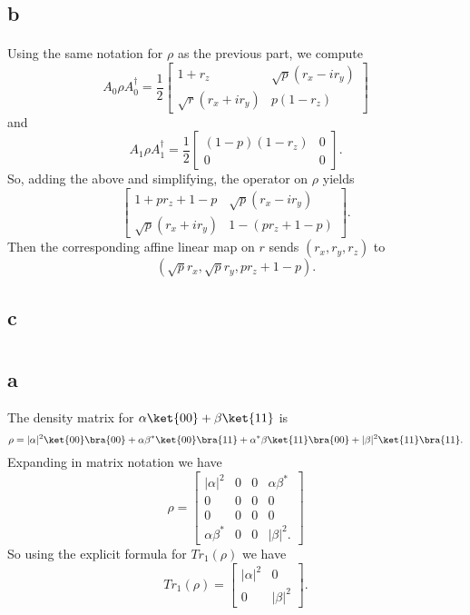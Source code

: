 \documentclass[letterpaper,12pt,oneside,onecolumn]{article}
\begin{document}
\subsection{b}
\paragraph{}
Using the same notation for $\rho$ as the previous part, we compute 
$$A_0\rho A_0^\dagger = \frac{1}{2}\begin{bmatrix}
1+r_z & \sqrt{p}(r_x - i r_y) \\ \sqrt{r}(r_x + ir_y) & p(1-r_z)
\end{bmatrix}$$
and $$A_1 \rho A_1^\dagger = \frac{1}{2}\begin{bmatrix} (1-p)(1-r_z) & 0 \\ 0 & 0 \end{bmatrix}.$$
So, adding the above and simplifying, the operator on $\rho$ yields
$$\begin{bmatrix}
1+ pr_z + 1-p & \sqrt{p}(r_x - i r_y) \\ \sqrt{p}(r_x + i r_y) & 1 - (pr_z + 1-p)
\end{bmatrix}.$$
Then the corresponding affine linear map on $r$ sends $(r_x, r_y, r_z)$ to
$$ (\sqrt{p}r_x, \sqrt{p}r_y, pr_z + 1-p).$$
\subsection{c}

\section{}
\subsection{a}
The density matrix for $\alpha\ket{00} + \beta\ket{11}$ is
$$\rho = |\alpha|^2\ket{00}\bra{00} + \alpha\beta^*\ket{00}\bra{11} + \alpha^*\beta\ket{11}\bra{00} + |\beta|^2\ket{11}\bra{11}.$$
Expanding in matrix notation we have
$$\rho = \begin{bmatrix}
|\alpha|^2 &0 & 0 &\alpha\beta^* \\
0 & 0 & 0 & 0\\
0 & 0 & 0 & 0\\
\alpha\beta^* & 0 & 0 &|\beta|^2.
\end{bmatrix}$$
So using the explicit formula for $Tr_1(\rho)$ we have
$$Tr_1(\rho) = \begin{bmatrix}
|\alpha|^2 & 0 \\
0 & |\beta|^2
\end{bmatrix}.$$
\end{document}
